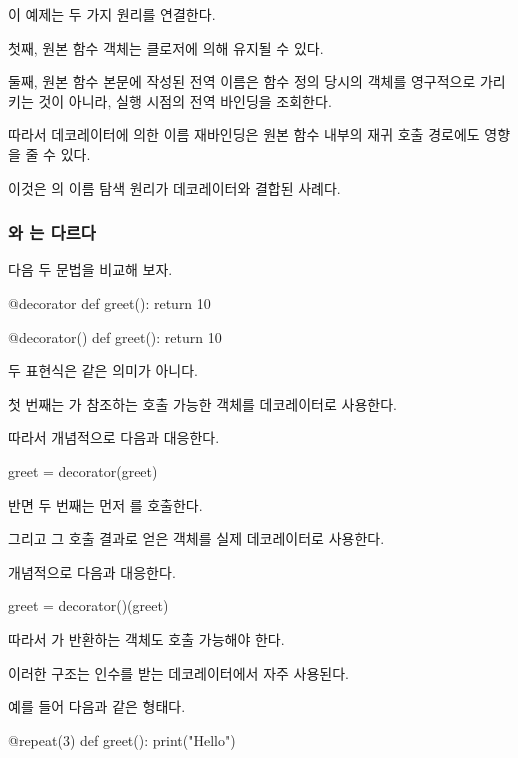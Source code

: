 이 예제는 두 가지 원리를 연결한다.

첫째, 원본 함수 객체는 클로저에 의해 유지될 수 있다.

둘째, 원본 함수 본문에 작성된 전역 이름은 함수 정의 당시의 객체를 영구적으로 가리키는 것이 아니라, 실행 시점의 전역 바인딩을 조회한다.

따라서 데코레이터에 의한 이름 재바인딩은 원본 함수 내부의 재귀 호출 경로에도 영향을 줄 수 있다.

이것은 의 이름 탐색 원리가 데코레이터와 결합된 사례다.

\subsubsection{와 는 다르다}

다음 두 문법을 비교해 보자.

\begin{dhkcode}
@decorator
def greet():
    return 10
\end{dhkcode}

\begin{dhkcode}
@decorator()
def greet():
    return 10
\end{dhkcode}

두 표현식은 같은 의미가 아니다.

첫 번째는 가 참조하는 호출 가능한 객체를 데코레이터로 사용한다.

따라서 개념적으로 다음과 대응한다.

\begin{dhkcode}
greet = decorator(greet)
\end{dhkcode}

반면 두 번째는 먼저 를 호출한다.

그리고 그 호출 결과로 얻은 객체를 실제 데코레이터로 사용한다.

개념적으로 다음과 대응한다.

\begin{dhkcode}
greet = decorator()(greet)
\end{dhkcode}

따라서 가 반환하는 객체도 호출 가능해야 한다.

이러한 구조는 인수를 받는 데코레이터에서 자주 사용된다.

예를 들어 다음과 같은 형태다.

\begin{dhkcode}
@repeat(3)
def greet():
    print("Hello")
\end{dhkcode}

